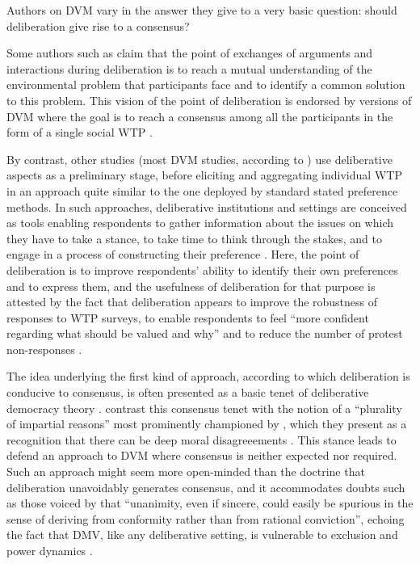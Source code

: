 \documentclass[version=3.21, pagesize, twoside=off, bibliography=totoc, DIV=calc, fontsize=12pt, a4paper, french, english]{scrartcl}
\begin{document}
Authors on DVM vary in the answer they give to a very basic question: should deliberation give rise to a consensus?

Some authors such as \citet{vatn_institutional_2009} claim that the point of exchanges of arguments and interactions during deliberation is to reach a mutual understanding of the environmental problem that participants face and to identify a common solution to this problem. This vision of the point of deliberation is endorsed by versions of DVM where the goal is to reach a consensus among all the participants in the form of a single social WTP \citep{orchard-webb_deliberative_2016}.

By contrast, other studies (most DVM studies, according to \citet{bunse_what_2015}) use deliberative aspects as a preliminary stage, before eliciting and aggregating individual WTP in an approach quite similar to the one deployed by standard stated preference methods. In such approaches, deliberative institutions and settings are conceived as tools enabling respondents to gather information about the issues on which they have to take a stance, to take time to think through the stakes, and to engage in a process of constructing their preference \citep{braga_preference_2005}. Here, the point of deliberation is to improve respondents' ability to identify their own preferences and to express them, and the usefulness of deliberation for that purpose is attested by the fact that deliberation appears to improve the robustness of responses to WTP surveys, to enable respondents to feel ``more confident regarding what should be valued and why'' \citep[p. 125, cited by \citet{bartkowski_beyond_2018}]{svedsater_economic_2003} and to reduce the number of protest non-responses \citep{szabo_reducing_2011}.

The idea underlying the first kind of approach, according to which deliberation is conducive to consensus, is often presented as a basic tenet of deliberative democracy theory \citep{wilson_discourse-based_2002}. \citet{bartkowski_beyond_2018} contrast this consensus tenet with the notion of a ``plurality of impartial reasons'' most prominently championed by \citet{sen_idea_2009}, which they present as a recognition that there can be deep moral disagreeements \citep{dryzek_deliberative_2013}. This stance leads \citet{bartkowski_beyond_2018} to defend an approach to DVM where consensus is neither expected nor required. Such an approach might seem more open-minded than the doctrine that deliberation unavoidably generates consensus, and it accommodates doubts such as those voiced by \citet{elster_sour_1983} that ``unanimity, even if sincere, could easily be spurious in the sense of deriving from conformity rather than from rational conviction'', echoing the fact that DMV, like any deliberative setting, is vulnerable to exclusion and power dynamics \citep{volker_exploring_2016,vargas_background_2016,vargas_problem_2017}. 
\end{document}
